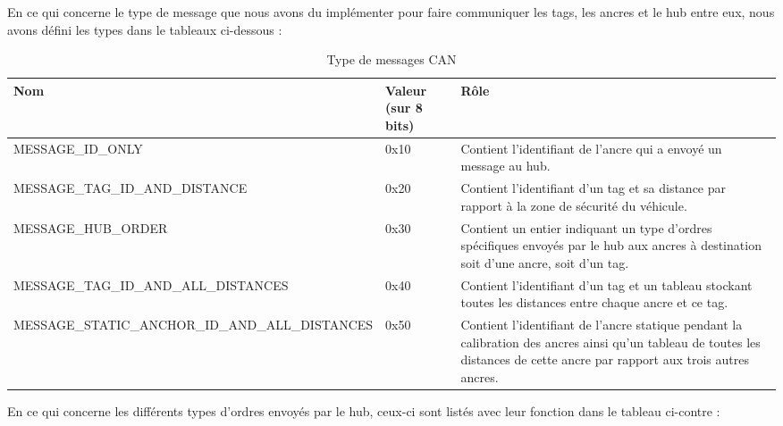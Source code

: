 En ce qui concerne le type de message que nous avons du implémenter pour faire communiquer les tags, les ancres et le hub entre eux, nous avons défini les types dans le tableaux ci-dessous :

\begin{table}[H]
    \centering
    \begin{tabular}{|p{5cm}|l|p{7.5cm}|}
        \hline
        \textbf{Nom} & \textbf{Valeur (sur 8 bits)} & \textbf{Rôle}\\
        \hline
        MESSAGE\_ID\_ONLY & 0x10 & Contient l'identifiant de l'ancre qui a envoyé un message au hub.\\
        \hline
        MESSAGE\_TAG\_ID\_AND\_\allowbreak DISTANCE & 0x20 & Contient l'identifiant d'un tag et sa distance par rapport à la zone de sécurité du véhicule.\\
        \hline
        MESSAGE\_HUB\_ORDER & 0x30 & Contient un entier indiquant un type d'ordres spécifiques envoyés par le hub aux ancres à destination soit d'une ancre, soit d'un tag.\\
        \hline
        MESSAGE\_TAG\_ID\_AND\_\allowbreak ALL\_DISTANCES & 0x40 & Contient l'identifiant d'un tag et un tableau stockant toutes les distances entre chaque ancre et ce tag.\\
        \hline
        MESSAGE\_STATIC\_ANCHOR\_\allowbreak ID\_AND\_ALL\_DISTANCES & 0x50 & Contient l'identifiant de l'ancre statique pendant la calibration des ancres ainsi qu'un tableau de toutes les distances de cette ancre par rapport aux trois autres ancres.\\
        \hline
    \end{tabular}
    \caption{Type de messages CAN}
\end{table}

En ce qui concerne les différents types d'ordres envoyés par le hub, ceux-ci sont listés avec leur fonction dans le tableau ci-contre :

